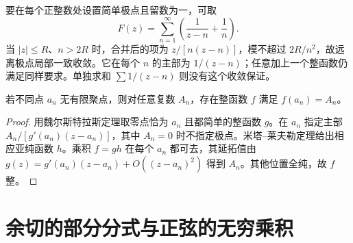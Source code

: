 \begin{example}[规定留数不能确定唯一函数]
要在每个正整数处设置简单极点且留数为一，可取
\[
 F(z)=\sum_{n=1}^{\infty}\left(\frac1{z-n}+\frac1n\right).
\]
当 $|z|\le R$、$n>2R$ 时，合并后的项为 $z/[n(z-n)]$，模不超过 $2R/n^2$，故远离极点局部一致收敛。它在每个 $n$ 的主部为 $1/(z-n)$；任意加上一个整函数仍满足同样要求。单独求和 $\sum1/(z-n)$ 则没有这个收敛保证。
\end{example}

\begin{corollary}[离散点上的整函数插值]
\label{cor:ca-entire-interpolation}
若不同点 $a_n$ 无有限聚点，则对任意复数 $A_n$，存在整函数 $f$ 满足 $f(a_n)=A_n$。
\end{corollary}
\begin{proof}
用魏尔斯特拉斯定理取零点恰为 $a_n$ 且都简单的整函数 $g$。在 $a_n$ 指定主部 $A_n/[g'(a_n)(z-a_n)]$，其中 $A_n=0$ 时不指定极点。米塔--莱夫勒定理给出相应亚纯函数 $h$。乘积 $f=gh$ 在每个 $a_n$ 都可去，其延拓值由 $g(z)=g'(a_n)(z-a_n)+O((z-a_n)^2)$ 得到 $A_n$。其他位置全纯，故 $f$ 整。
\end{proof}

\section{余切的部分分式与正弦的无穷乘积}

